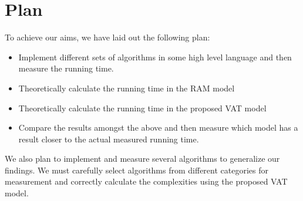 \section{Plan}
To achieve our aims, we have laid out the following plan:
  \begin{itemize}
    \item Implement different sets of algorithms in some high level language
    and then measure the running time.
    \item Theoretically calculate the running time in the RAM model
    \item Theoretically calculate the running time in the proposed VAT model
    \item Compare the results amongst the above and then measure which model
    has a result closer to the actual measured running time.
  \end{itemize}
  
  We also plan to implement and measure several algorithms to generalize our
  findings. We must carefully select algorithms from different categories for
  measurement and correctly calculate the complexities using the proposed VAT
  model.